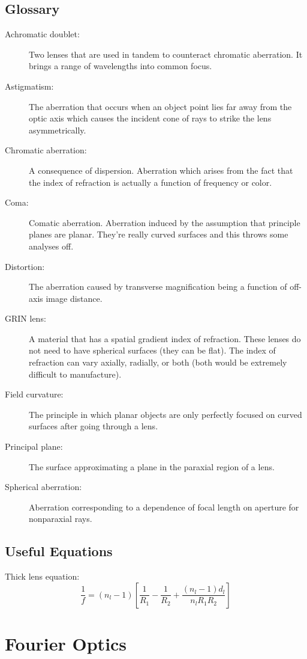 \documentclass[12pt]{report}
\begin{document}
\section{Glossary}
\begin{description}
\item[Achromatic doublet: ] Two lenses that are used in tandem to counteract chromatic aberration. It brings a range of wavelengths into common focus.
\item[Astigmatism: ] The aberration that occurs when an object point lies far away from the optic axis which causes the incident cone of rays to strike the lens asymmetrically. 
\item[Chromatic aberration: ] A consequence of dispersion. Aberration which arises from the fact that the index of refraction is actually a function of frequency or color. 
\item[Coma: ] Comatic aberration. Aberration induced by the assumption that principle planes are planar. They're really curved surfaces and this throws some analyses off. 
\item[Distortion: ] The aberration caused by transverse magnification being a function of off-axis image distance. 
\item[GRIN lens: ] A material that has a spatial gradient index of refraction. These lenses do not need to have spherical surfaces (they can be flat). The index of refraction can vary axially, radially, or both (both would be extremely difficult to manufacture). 
\item[Field curvature: ] The principle in which planar objects are only perfectly focused on curved surfaces after going through a lens. 
\item[Principal plane: ] The surface approximating a plane in the paraxial region of a lens.
\item[Spherical aberration: ] Aberration corresponding to a dependence of focal length on aperture for nonparaxial rays. 
\end{description}

\section{Useful Equations}
Thick lens equation:
\[\frac{1}{f} = (n_l - 1) \left[\frac{1}{R_1} - \frac{1}{R_2} + \frac{(n_l-1)d_l}{n_lR_1R_2}\right]\]


\chapter{Fourier Optics}
\end{document}
